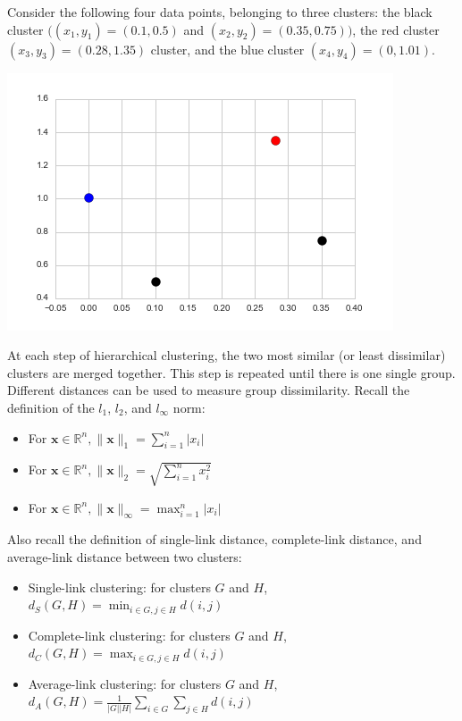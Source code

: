 \documentclass[submit]{harvardml}
\begin{document}
\begin{problem}

  Consider the following four data points, belonging to three clusters: the
  black cluster $((x_1, y_1) = (0.1, 0.5) $ and $(x_2, y_2) = (0.35, 0.75))$,
  the red cluster $(x_3, y_3) = (0.28, 1.35)$ cluster, and the blue cluster
  $(x_4, y_4) = (0, 1.01)$.

  \begin{center} \includegraphics[scale=.4]{scatterplot.png} \end{center}
  At each step of hierarchical clustering, the two most similar (or least
  dissimilar) clusters are merged together. This step is repeated until there is
  one single group. Different distances can be used to measure group
  dissimilarity. Recall the definition of the $l_1$, $l_2$, and $l_{\infty}$
  norm:
  \begin{itemize}
    \item For $\mathbf{x} \in \mathbb{R}^n, \| \mathbf{x} \|_1 = \sum_{i = 1}^n
      |x_i|$
    \item For $\mathbf{x} \in \mathbb{R}^n, \| \mathbf{x} \|_2 = \sqrt{\sum_{i =
      1}^n x_i^2 }$
    \item For $\mathbf{x} \in \mathbb{R}^n, \| \mathbf{x} \|_{\infty} = \max_{i
      = 1}^n |x_i|$
  \end{itemize}
  Also recall the definition of single-link distance, complete-link distance,
  and average-link distance between two clusters:
  \begin{itemize}
    \item Single-link clustering: for clusters $G$ and $H$, $d_{S}(G, H) =
    \min_{i \in G, j\in H} d(i, j)$
    \item Complete-link clustering: for clusters $G$ and $H$, $d_{C}(G, H) =
    \max_{i \in G, j\in H} d(i, j)$
    \item Average-link clustering: for clusters $G$ and $H$, $d_{A}(G, H) =
      \frac{1}{|G| |H|} \sum_{i\in G}\sum_{j \in H} d(i, j)$
  \end{itemize}

\end{problem}
\end{document}
